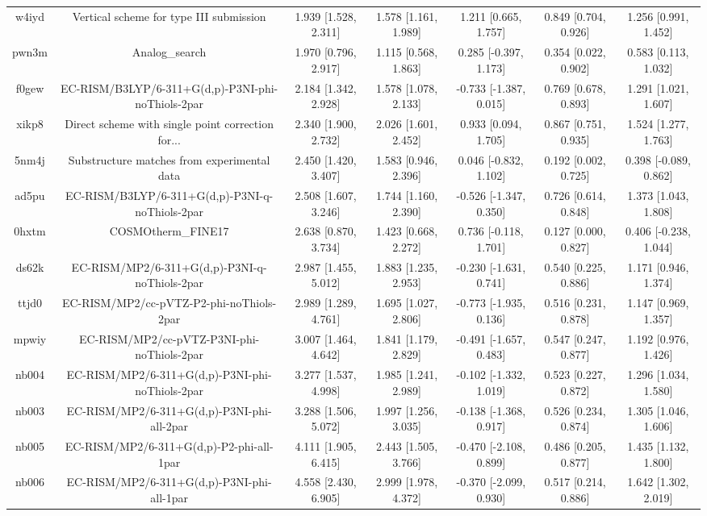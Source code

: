 \documentclass{article}
\begin{document}
\begin{center}
\begin{longtable}{|ccccccc|}
 w4iyd &            Vertical scheme for type III submission &  1.939 [1.528, 2.311] &  1.578 [1.161, 1.989] &     1.211 [0.665, 1.757] &  0.849 [0.704, 0.926] &   1.256 [0.991, 1.452] \\
 pwn3m &                                     Analog\_search &  1.970 [0.796, 2.917] &  1.115 [0.568, 1.863] &    0.285 [-0.397, 1.173] &  0.354 [0.022, 0.902] &   0.583 [0.113, 1.032] \\
 f0gew &  EC-RISM/B3LYP/6-311+G(d,p)-P3NI-phi-noThiols-2par &  2.184 [1.342, 2.928] &  1.578 [1.078, 2.133] &   -0.733 [-1.387, 0.015] &  0.769 [0.678, 0.893] &   1.291 [1.021, 1.607] \\
 xikp8 &  Direct scheme with single point correction for... &  2.340 [1.900, 2.732] &  2.026 [1.601, 2.452] &     0.933 [0.094, 1.705] &  0.867 [0.751, 0.935] &   1.524 [1.277, 1.763] \\
 5nm4j &        Substructure matches from experimental data &  2.450 [1.420, 3.407] &  1.583 [0.946, 2.396] &    0.046 [-0.832, 1.102] &  0.192 [0.002, 0.725] &  0.398 [-0.089, 0.862] \\
 ad5pu &    EC-RISM/B3LYP/6-311+G(d,p)-P3NI-q-noThiols-2par &  2.508 [1.607, 3.246] &  1.744 [1.160, 2.390] &   -0.526 [-1.347, 0.350] &  0.726 [0.614, 0.848] &   1.373 [1.043, 1.808] \\
 0hxtm &                                 COSMOtherm\_FINE17 &  2.638 [0.870, 3.734] &  1.423 [0.668, 2.272] &    0.736 [-0.118, 1.701] &  0.127 [0.000, 0.827] &  0.406 [-0.238, 1.044] \\
 ds62k &      EC-RISM/MP2/6-311+G(d,p)-P3NI-q-noThiols-2par &  2.987 [1.455, 5.012] &  1.883 [1.235, 2.953] &   -0.230 [-1.631, 0.741] &  0.540 [0.225, 0.886] &   1.171 [0.946, 1.374] \\
 ttjd0 &           EC-RISM/MP2/cc-pVTZ-P2-phi-noThiols-2par &  2.989 [1.289, 4.761] &  1.695 [1.027, 2.806] &   -0.773 [-1.935, 0.136] &  0.516 [0.231, 0.878] &   1.147 [0.969, 1.357] \\
 mpwiy &         EC-RISM/MP2/cc-pVTZ-P3NI-phi-noThiols-2par &  3.007 [1.464, 4.642] &  1.841 [1.179, 2.829] &   -0.491 [-1.657, 0.483] &  0.547 [0.247, 0.877] &   1.192 [0.976, 1.426] \\
 nb004 &    EC-RISM/MP2/6-311+G(d,p)-P3NI-phi-noThiols-2par &  3.277 [1.537, 4.998] &  1.985 [1.241, 2.989] &   -0.102 [-1.332, 1.019] &  0.523 [0.227, 0.872] &   1.296 [1.034, 1.580] \\
 nb003 &         EC-RISM/MP2/6-311+G(d,p)-P3NI-phi-all-2par &  3.288 [1.506, 5.072] &  1.997 [1.256, 3.035] &   -0.138 [-1.368, 0.917] &  0.526 [0.234, 0.874] &   1.305 [1.046, 1.606] \\
 nb005 &           EC-RISM/MP2/6-311+G(d,p)-P2-phi-all-1par &  4.111 [1.905, 6.415] &  2.443 [1.505, 3.766] &   -0.470 [-2.108, 0.899] &  0.486 [0.205, 0.877] &   1.435 [1.132, 1.800] \\
 nb006 &         EC-RISM/MP2/6-311+G(d,p)-P3NI-phi-all-1par &  4.558 [2.430, 6.905] &  2.999 [1.978, 4.372] &   -0.370 [-2.099, 0.930] &  0.517 [0.214, 0.886] &   1.642 [1.302, 2.019] \\
\end{longtable}
\end{center}
\end{document}
